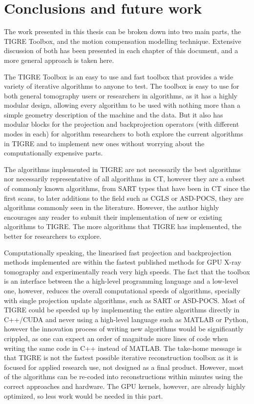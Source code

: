 \chapter{Conclusions and future work}

The work presented in this thesis can be broken down into two main parts, the TIGRE Toolbox, and the motion compensation modelling technique. Extensive discussion of both has been presented in each chapter of this document, and a more general approach is taken here. 

The TIGRE Toolbox is an easy to use and fast toolbox that provides a wide variety of iterative algorithms to anyone to test. The toolbox is easy to use for both general tomography users or researchers in algorithms, as it has a highly modular design, allowing every algorithm to be used with nothing more than a simple geometry description of the machine and the data. But it also has modular blocks for the projection and backprojection operators (with different modes in each) for algorithm researchers to both explore the current algorithms in TIGRE and to implement new ones without worrying about the computationally expensive parts. 

The algorithms implemented in TIGRE are not necessarily the best algorithms nor necessarily representative of all algorithms in CT, however they are a subset of commonly known algorithms, from SART types that have been in CT since the first scans, to later additions to the field such as CGLS or ASD-POCS, they are algorithms commonly seen in the literature. However, the author highly encourages any reader to submit their implementation of new or existing algorithms to TIGRE. The more algorithms that TIGRE has implemented, the better for researchers to explore.

Computationally speaking, the linearised fast projection and backprojection methods implemented are within the fastest published methods for GPU X-ray tomography and experimentally reach very high speeds. The fact that the toolbox is an interface between the a high-level programming language and a low-level one, however, reduces the overall computational speeds of algorithms, specially with single projection update algorithms, such as SART or ASD-POCS. Most of TIGRE could be speeded up by implementing the entire algorithms directly in C++/CUDA and never using a high-level language such as MATLAB or Python, however the innovation process of writing new algorithms would be significantly crippled, as one can expect an order of magnitude more lines of code when writing the same code in C++ instead of MATLAB. The take-home message is that TIGRE is not the fastest possible iterative reconstruction toolbox as it is focused for applied research use, not designed as a final product. However, most of the algorithms can be re-coded into reconstructions within minutes using the correct approaches and hardware. The GPU kernels, however, are already highly optimized, so less work would be needed in this part.

